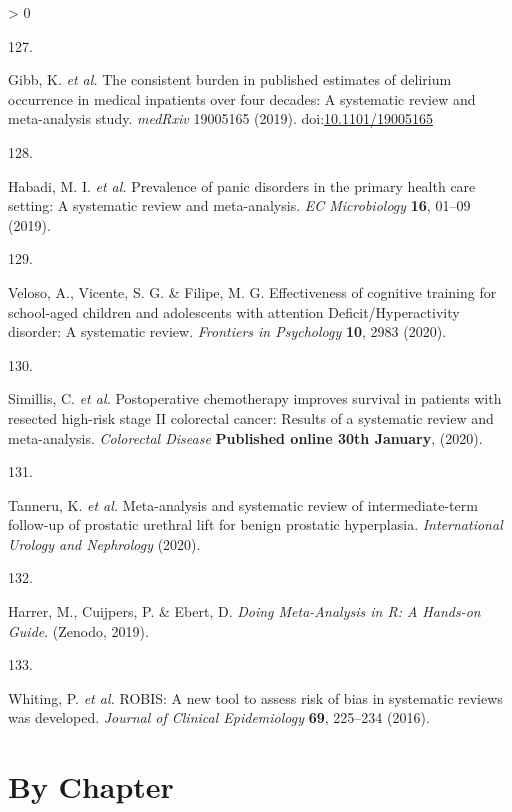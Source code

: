 \documentclass[a4paper, twoside]{templates/ociamthesis}
\newlength{\cslhangindent}
\newlength{\csllabelwidth}
\newenvironment{CSLReferences}[3] %
 {%
  \setlength{\parindent}{0pt}
  \ifodd #1 \everypar{\setlength{\hangindent}{\cslhangindent}}\ignorespaces\fi
  \ifnum #2 > 0
  \setlength{\parskip}{#2\baselineskip}
  \fi
 }%
 {}
\newcommand{\CSLLeftMargin}[1]{\parbox[t]{\maxof{\widthof{#1}}{\csllabelwidth}}{#1}}
\newcommand{\CSLRightInline}[1]{\parbox[t]{\linewidth - \csllabelwidth}{#1}}
\begin{document}
\begin{CSLReferences}{0}{0}
\leavevmode\hypertarget{ref-gibb2019consistent}{}%
\CSLLeftMargin{127. }
\CSLRightInline{Gibb, K. \emph{et al.} The consistent burden in published estimates of delirium occurrence in medical inpatients over four decades: A systematic review and meta-analysis study. \emph{medRxiv} 19005165 (2019). doi:\href{https://doi.org/10.1101/19005165}{10.1101/19005165}}

\leavevmode\hypertarget{ref-habadi2019prevalence}{}%
\CSLLeftMargin{128. }
\CSLRightInline{Habadi, M. I. \emph{et al.} Prevalence of panic disorders in the primary health care setting: {A} systematic review and meta-analysis. \emph{EC Microbiology} \textbf{16}, 01--09 (2019).}

\leavevmode\hypertarget{ref-veloso2020effectiveness}{}%
\CSLLeftMargin{129. }
\CSLRightInline{Veloso, A., Vicente, S. G. \& Filipe, M. G. Effectiveness of cognitive training for school-aged children and adolescents with attention {Deficit}/{Hyperactivity} disorder: {A} systematic review. \emph{Frontiers in Psychology} \textbf{10}, 2983 (2020).}

\leavevmode\hypertarget{ref-simillis2020}{}%
\CSLLeftMargin{130. }
\CSLRightInline{Simillis, C. \emph{et al.} Postoperative chemotherapy improves survival in patients with resected high-risk stage {II} colorectal cancer: Results of a systematic review and meta-analysis. \emph{Colorectal Disease} \textbf{Published online 30th January}, (2020).}

\leavevmode\hypertarget{ref-tanneru2020}{}%
\CSLLeftMargin{131. }
\CSLRightInline{Tanneru, K. \emph{et al.} Meta-analysis and systematic review of intermediate-term follow-up of prostatic urethral lift for benign prostatic hyperplasia. \emph{International Urology and Nephrology} (2020).}

\leavevmode\hypertarget{ref-mathias_harrer_2019_2551803}{}%
\CSLLeftMargin{132. }
\CSLRightInline{Harrer, M., Cuijpers, P. \& Ebert, D. \emph{Doing {Meta}-{Analysis} in {R}: {A Hands}-on {Guide}}. ({Zenodo}, 2019).}

\leavevmode\hypertarget{ref-whiting2016robis}{}%
\CSLLeftMargin{133. }
\CSLRightInline{Whiting, P. \emph{et al.} {ROBIS}: A new tool to assess risk of bias in systematic reviews was developed. \emph{Journal of Clinical Epidemiology} \textbf{69}, 225--234 (2016).}

\end{CSLReferences}

\startappendices

\hypertarget{chapter-appendix-heading}{%
\chapter{By Chapter}\label{chapter-appendix-heading}}
\end{document}
